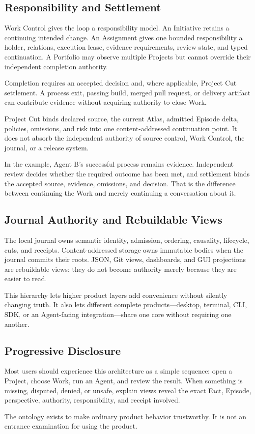 \subsection{Responsibility and Settlement}

Work Control gives the loop a responsibility model. An Initiative retains a
continuing intended change. An Assignment gives one bounded responsibility a
holder, relations, execution lease, evidence requirements, review state, and
typed continuation. A Portfolio may observe multiple Projects but cannot
override their independent completion authority.

Completion requires an accepted decision and, where applicable, Project Cut
settlement. A process exit, passing build, merged pull request, or delivery
artifact can contribute evidence without acquiring authority to close Work.

Project Cut binds declared source, the current Atlas, admitted Episode delta,
policies, omissions, and risk into one content-addressed continuation point.
It does not absorb the independent authority of source control, Work Control,
the journal, or a release system.

In the example, Agent B's successful process remains evidence. Independent
review decides whether the required outcome has been met, and settlement binds
the accepted source, evidence, omissions, and decision. That is the difference
between continuing the Work and merely continuing a conversation about it.

\subsection{Journal Authority and Rebuildable Views}

The local journal owns semantic identity, admission, ordering, causality,
lifecycle, cuts, and receipts. Content-addressed storage owns immutable bodies
when the journal commits their roots. JSON, Git views, dashboards, and GUI
projections are rebuildable views; they do not become authority merely because
they are easier to read.

This hierarchy lets higher product layers add convenience without silently
changing truth. It also lets different complete products---desktop, terminal,
CLI, SDK, or an Agent-facing integration---share one core without requiring
one another.

\subsection{Progressive Disclosure}

Most users should experience this architecture as a simple sequence: open a
Project, choose Work, run an Agent, and review the result. When something is
missing, disputed, denied, or unsafe, explain views reveal the exact Fact,
Episode, perspective, authority, responsibility, and receipt involved.

The ontology exists to make ordinary product behavior trustworthy. It is not
an entrance examination for using the product.
